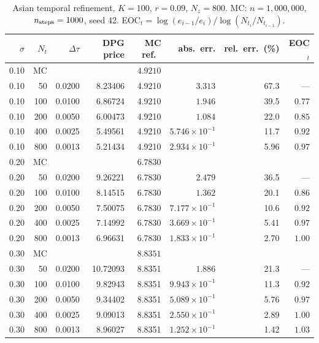 \documentclass[11pt,a4paper]{article}
\newcommand{\Nz}{N_z}
\newcommand{\Nt}{N_t}
\begin{document}
\begin{table}[htbp]
\centering
\caption{Asian temporal refinement, $K = 100$, $r = 0.09$, $\Nz = 800$.
         MC: $n = 1{,}000{,}000$, $n_{\rm steps} = 1000$, seed 42.
         EOC$_t = \log(e_{i-1}/e_i)/\log(\Nt_i/\Nt_{i-1})$.}
\label{tab:temporal}
\small
\begin{tabular}{rrrrrrrr}
\toprule
$\sigma$ & $\Nt$ & $\Delta\tau$ & DPG price & MC ref.\ & abs.\ err. & rel.\ err.\ (\%) & EOC$_t$ \\
\midrule
0.10 & MC & & & $4.9210$ & & & \\
\midrule
0.10 &  50 & 0.0200 & 8.23406 & 4.9210 & $3.313$ & 67.3 & --- \\
0.10 & 100 & 0.0100 & 6.86724 & 4.9210 & $1.946$ & 39.5 & $0.77$ \\
0.10 & 200 & 0.0050 & 6.00473 & 4.9210 & $1.084$ & 22.0 & $0.85$ \\
0.10 & 400 & 0.0025 & 5.49561 & 4.9210 & $5.746\times10^{-1}$ & 11.7 & $0.92$ \\
0.10 & 800 & 0.0013 & 5.21434 & 4.9210 & $2.934\times10^{-1}$ &  5.96 & $0.97$ \\
\midrule
0.20 & MC & & & $6.7830$ & & & \\
\midrule
0.20 &  50 & 0.0200 & 9.26221 & 6.7830 & $2.479$ & 36.5 & --- \\
0.20 & 100 & 0.0100 & 8.14515 & 6.7830 & $1.362$ & 20.1 & $0.86$ \\
0.20 & 200 & 0.0050 & 7.50075 & 6.7830 & $7.177\times10^{-1}$ & 10.6 & $0.92$ \\
0.20 & 400 & 0.0025 & 7.14992 & 6.7830 & $3.669\times10^{-1}$ &  5.41 & $0.97$ \\
0.20 & 800 & 0.0013 & 6.96631 & 6.7830 & $1.833\times10^{-1}$ &  2.70 & $1.00$ \\
\midrule
0.30 & MC & & & $8.8351$ & & & \\
\midrule
0.30 &  50 & 0.0200 & 10.72093 & 8.8351 & $1.886$ & 21.3 & --- \\
0.30 & 100 & 0.0100 &  9.82943 & 8.8351 & $9.943\times10^{-1}$ & 11.3 & $0.92$ \\
0.30 & 200 & 0.0050 &  9.34402 & 8.8351 & $5.089\times10^{-1}$ &  5.76 & $0.97$ \\
0.30 & 400 & 0.0025 &  9.09013 & 8.8351 & $2.550\times10^{-1}$ &  2.89 & $1.00$ \\
0.30 & 800 & 0.0013 &  8.96027 & 8.8351 & $1.252\times10^{-1}$ &  1.42 & $1.03$ \\
\bottomrule
\end{tabular}
\end{table}
\end{document}
